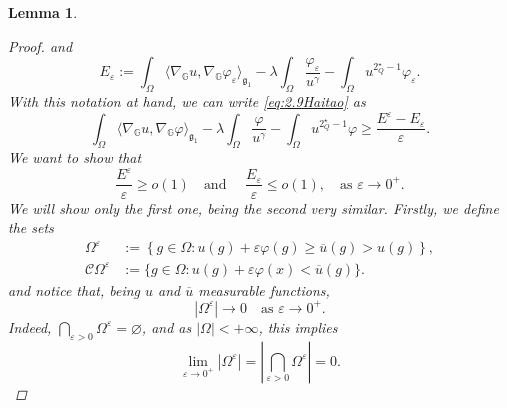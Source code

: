 \documentclass[11pt]{amsart}
\numberwithin{equation}{section} %
\newtheorem{lemma}[teo]{Lemma}
\theoremstyle{definition}
\begin{document}
\begin{lemma}
\begin{proof}
		\noindent and 
		\begin{equation*}
			E_{\varepsilon}:= \int_{\Omega} \langle \nabla_{\mathbb{G}}u, \nabla_{\mathbb{G}}\varphi_{\varepsilon}\rangle_{\mathfrak{g}_{1}}  - \lambda \int_{\Omega}\dfrac{\varphi_{\varepsilon}}{u^{\gamma}} - \int_{\Omega}u^{2^{\star}_{Q}-1}\varphi_{\varepsilon}.
		\end{equation*}
		With this notation at hand, we can write \eqref{eq:2.9Haitao} as 
		\begin{equation*}
			\int_{\Omega} \langle \nabla_{\mathbb{G}}u, \nabla_{\mathbb{G}}\varphi \rangle_{\mathfrak{g}_{1}}  - \lambda \int_{\Omega}\dfrac{\varphi}{u^{\gamma}} - \int_{\Omega}u^{2^{\star}_{Q}-1}\varphi \geq \dfrac{E^{\varepsilon} - E_{\varepsilon}}{\varepsilon}.
		\end{equation*}
		We want to show that
		$$\dfrac{E^{\varepsilon}}{\varepsilon} \geq o(1) \quad \textrm{and }  \quad \dfrac{E_{\varepsilon}}{\varepsilon} \leq o(1), \quad \textrm{as } \varepsilon \to 0^+.$$
		We will show only the first one, being the second very similar.
		Firstly, we define the sets
		\begin{align*}
			\Omega^{\varepsilon}&:= \left\{ g \in \Omega: u(g) +\varepsilon\varphi(g) \geq \overline{u}(g) > u(g)\right\},\\
			\mathcal{C}\Omega^{\varepsilon}&:= \{g \in \Omega: u(g)+\varepsilon\varphi(x)<\overline{u}(g)\}.
		\end{align*}
		\noindent
		 and notice that, being $u$ and $\overline{u}$ measurable functions,
		$$|\Omega^{\varepsilon}| \to 0 \quad  \textrm{as } \varepsilon \to 0^+.$$
		Indeed, $\bigcap_{\varepsilon>0}\Omega^\varepsilon=\varnothing$, and 
		as $|\Omega|<+\infty$, this implies
		\[
		\lim_{\varepsilon\to0^+}|\Omega^\varepsilon|=\left|\bigcap_{\varepsilon>0}\Omega^\varepsilon\right|=0.
		\]
		

\end{proof}
\end{lemma}
\end{document}
